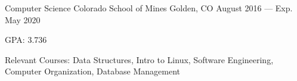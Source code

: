 

\begin{cventries}

  \cventry
    {Computer Science} %
    {Colorado School of Mines} %
    {Golden, CO} %
    {August 2016 --- Exp. May 2020} %
    {
      \begin{cvitems} %
        \item {GPA\@: 3.736}
        \item {Relevant Courses: Data Structures, Intro to Linux, Software Engineering, Computer Organization, Database Management}
      \end{cvitems}
    }

\end{cventries}
